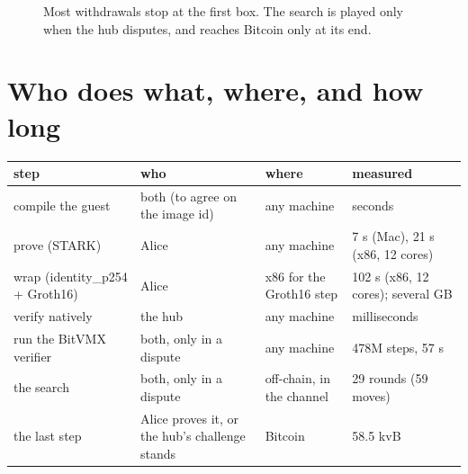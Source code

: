 \documentclass[11pt]{article}
\begin{document}
\begin{figure}[H]
\centering
{}
\caption{Most withdrawals stop at the first box. The search is played
only when the hub disputes, and reaches Bitcoin only at its end.}
\end{figure}

\section{Who does what, where, and how long}
\label{sec:who}

\begin{center}
\small
\begin{tabularx}{\linewidth}{@{}>{\raggedright\arraybackslash}p{40mm}>{\raggedright\arraybackslash}p{30mm}>{\raggedright\arraybackslash}p{28mm}L@{}}
\toprule
step & who & where & measured \\
\midrule
compile the guest & both (to agree on the image id) & any machine & seconds \\
prove (STARK) & Alice & any machine & 7 s (Mac), 21 s (x86, 12 cores) \\
wrap (identity\_p254 + Groth16) & Alice & x86 for the Groth16 step & 102 s (x86, 12 cores); several GB \\
verify natively & the hub & any machine & milliseconds \\
run the BitVMX verifier & both, only in a dispute & any machine & 478M steps, 57 s \\
the search & both, only in a dispute & off-chain, in the channel & 29 rounds (59 moves) \\
the last step & Alice proves it, or the hub's challenge stands & Bitcoin & 58.5 kvB \\
\bottomrule
\end{tabularx}
\end{center}
\end{document}
